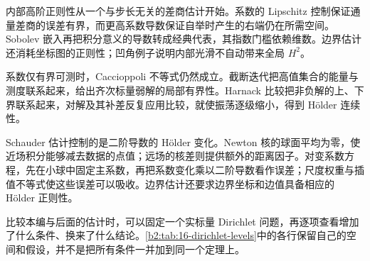 




\begin{chaptersummary}
内部高阶正则性从一个与步长无关的差商估计开始。系数的 Lipschitz 控制保证通量差商的误差有界，而更高系数导数保证自举时产生的右端仍在所需空间。Sobolev 嵌入再把积分意义的导数转成经典代表，其指数门槛依赖维数。边界估计还消耗坐标图的正则性；凹角例子说明内部光滑不自动带来全局 \(H^2\)。

\ProseParagraphBreak

系数仅有界可测时，Caccioppoli 不等式仍然成立。截断迭代把高值集合的能量与测度联系起来，给出齐次标量弱解的局部有界性。Harnack 比较把非负解的上、下界联系起来，对解及其补差反复应用比较，就使振荡逐级缩小，得到 Hölder 连续性。

\ProseParagraphBreak

Schauder 估计控制的是二阶导数的 Hölder 变化。Newton 核的球面平均为零，使近场积分能够减去数据的点值；远场的核差则提供额外的距离因子。对变系数方程，先在小球中固定主系数，再把系数变化乘以二阶导数看作误差；尺度权重与插值不等式使这些误差可以吸收。边界估计还要求边界坐标和边值具备相应的 Hölder 正则性。
\end{chaptersummary}

比较本编与后面的估计时，可以固定一个实标量 Dirichlet 问题，再逐项查看增加了什么条件、换来了什么结论。\cref{b2:tab:16-dirichlet-levels}中的各行保留自己的空间和假设，并不是把所有条件一并加到同一个定理上。

